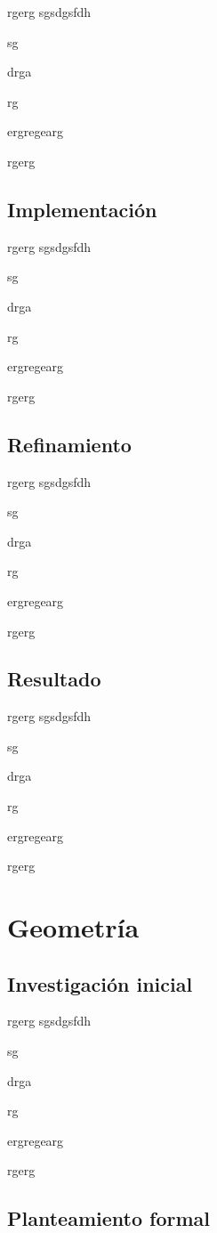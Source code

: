 rgerg
sgsdgsfdh

sg

drga

rg

ergregearg

rgerg

\subsection{Implementación}

rgerg
sgsdgsfdh

sg

drga

rg

ergregearg

rgerg

\subsection{Refinamiento}

rgerg
sgsdgsfdh

sg

drga

rg

ergregearg

rgerg

\subsection{Resultado}

rgerg
sgsdgsfdh

sg

drga

rg

ergregearg

rgerg


\section{Geometría}


\subsection{Investigación inicial}

rgerg
sgsdgsfdh

sg

drga

rg

ergregearg

rgerg

\subsection{Planteamiento formal}

